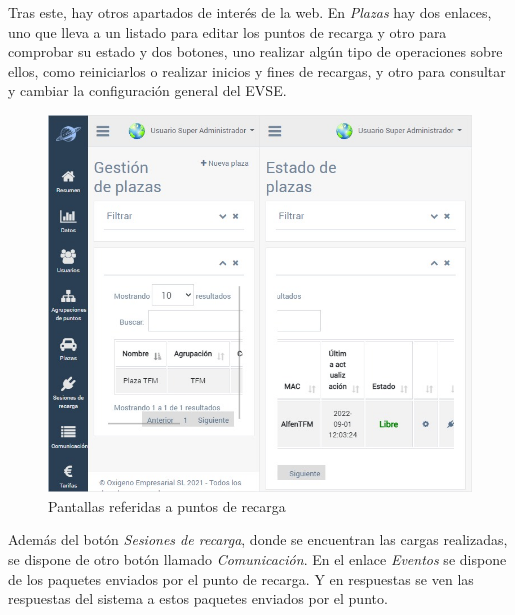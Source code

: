 \documentclass[12pt,a4paper,onecolumn,oneside]{report}
\begin{document}
Tras este, hay otros apartados de interés de la web. En \textit{Plazas} hay dos enlaces, uno que lleva a un listado para editar los puntos de recarga y otro para comprobar su estado y dos botones, uno realizar algún tipo de operaciones sobre ellos, como reiniciarlos o realizar inicios y fines de recargas, y otro para consultar y cambiar la configuración general del EVSE.


\begin{figure}[H] 
\centering
  \includegraphics[width=1\textwidth]{figuras/design4.png}
  \caption[Pantallas referidas a puntos de recarga]{Pantallas referidas a puntos de recarga\\
  }
  \label{fig:design4}
\end{figure}

Además del botón \textit{Sesiones de recarga}, donde se encuentran las cargas realizadas, se dispone de otro botón llamado \textit{Comunicación}. En el enlace \textit{Eventos} se dispone de los paquetes enviados por el punto de recarga. Y en respuestas se ven las respuestas del sistema a estos paquetes enviados por el punto.
\end{document}
